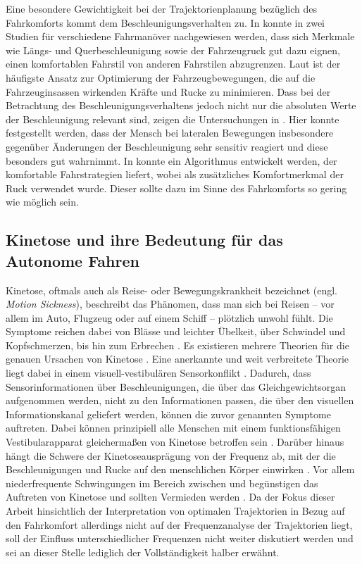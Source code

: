 Eine besondere Gewichtigkeit bei der Trajektorienplanung bezüglich des Fahrkomforts kommt dem Beschleunigungsverhalten zu. In \cite{Bellem.2016} konnte in zwei Studien für verschiedene Fahrmanöver nachgewiesen werden, dass sich Merkmale wie Längs- und Querbeschleunigung sowie der Fahrzeugruck gut dazu eignen, einen komfortablen Fahrstil von anderen Fahrstilen abzugrenzen. Laut \cite{Elbanhawi.2015} ist der häufigste Ansatz zur Optimierung der Fahrzeugbewegungen, die auf die Fahrzeuginsassen wirkenden Kräfte und Rucke zu minimieren. Dass bei der Betrachtung des Beschleunigungsverhaltens jedoch nicht nur die absoluten Werte der Beschleunigung relevant sind, zeigen die Untersuchungen in \cite{Gianna.1996}. Hier konnte festgestellt werden, dass der Mensch bei lateralen Bewegungen insbesondere gegenüber Änderungen der Beschleunigung sehr sensitiv reagiert und diese besonders gut wahrnimmt. In \cite{Dovgan.2013} konnte ein Algorithmus entwickelt werden, der komfortable Fahrstrategien liefert, wobei als zusätzliches Komfortmerkmal der Ruck verwendet wurde. Dieser sollte dazu im Sinne des Fahrkomforts so gering wie möglich sein.

\subsection{Kinetose und ihre Bedeutung für das Autonome Fahren}\label{sec:kinetose}
Kinetose, oftmals auch als Reise- oder Bewegungskrankheit bezeichnet (engl. \textit{Motion Sickness}), beschreibt das Phänomen, dass man sich bei Reisen -- vor allem im Auto, Flugzeug oder auf einem Schiff -- plötzlich unwohl fühlt. Die Symptome reichen dabei von Blässe und leichter Übelkeit, über Schwindel und Kopfschmerzen, bis hin zum Erbrechen \cite{Money.1970}. Es existieren mehrere Theorien für die genauen Ursachen von Kinetose \cite{Money.1970}. Eine anerkannte und weit verbreitete Theorie liegt dabei in einem visuell-vestibulären Sensorkonflikt \cite{Reason.1975,Golding.2006,Benson.2002}. Dadurch, dass Sensorinformationen über Beschleunigungen, die über das Gleichgewichtsorgan aufgenommen werden, nicht zu den Informationen passen, die über den visuellen Informationskanal geliefert werden, können die zuvor genannten Symptome auftreten. Dabei können prinzipiell alle Menschen mit einem funktionsfähigen Vestibularapparat gleichermaßen von Kinetose betroffen sein \cite{Lackner.2014}. Darüber hinaus hängt die Schwere der Kinetoseausprägung von der Frequenz ab, mit der die Beschleunigungen und Rucke auf den menschlichen Körper einwirken \cite{OHanlon.1974}. Vor allem niederfrequente Schwingungen im Bereich zwischen  und  begünstigen das Auftreten von Kinetose und sollten Vermieden werden \cite{OHanlon.1974,ISO.2631}. Da der Fokus dieser Arbeit hinsichtlich der Interpretation von optimalen Trajektorien in Bezug auf den Fahrkomfort allerdings nicht auf der Frequenzanalyse der Trajektorien liegt, soll der Einfluss unterschiedlicher Frequenzen nicht weiter diskutiert werden und sei an dieser Stelle lediglich der Vollständigkeit halber erwähnt.

